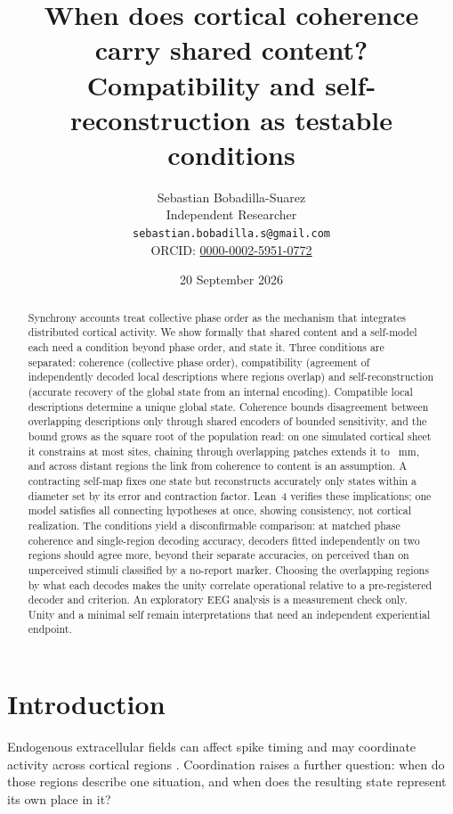 \documentclass[12pt]{article}
\title{When does cortical coherence carry shared content?\\
 Compatibility and self-reconstruction as testable conditions}
\author{Sebastian Bobadilla-Suarez\\
Independent Researcher\\
\texttt{sebastian.bobadilla.s@gmail.com}\\
ORCID: \href{https://orcid.org/0000-0002-5951-0772}{0000-0002-5951-0772}}
\date{20 September 2026}
\renewcommand{\cite}[1]{\citep{#1}}
\begin{document}
\begingroup
\singlespacing
\maketitle
\endgroup

\begin{abstract}
\singlespacing
\small
Synchrony accounts treat collective phase order as the mechanism that integrates distributed cortical activity. We show formally that shared content and a self-model each need a condition beyond phase order, and state it. Three conditions are separated: coherence (collective phase order), compatibility (agreement of independently decoded local descriptions where regions overlap) and self-reconstruction (accurate recovery of the global state from an internal encoding). Compatible local descriptions determine a unique global state. Coherence bounds disagreement between overlapping descriptions only through shared encoders of bounded sensitivity, and the bound grows as the square root of the population read: on one simulated cortical sheet it constrains at most \wavePatchInformativeSites{} sites, chaining through overlapping patches extends it to \waveNerveReachMm~mm, and across distant regions the link from coherence to content is an assumption. A contracting self-map fixes one state but reconstructs accurately only states within a diameter set by its error and contraction factor. Lean~4 verifies these implications; one model satisfies all connecting hypotheses at once, showing consistency, not cortical realization. The conditions yield a disconfirmable comparison: at matched phase coherence and single-region decoding accuracy, decoders fitted independently on two regions should agree more, beyond their separate accuracies, on perceived than on unperceived stimuli classified by a no-report marker. Choosing the overlapping regions by what each decodes makes the unity correlate operational relative to a pre-registered decoder and criterion. An exploratory EEG analysis is a measurement check only. Unity and a minimal self remain interpretations that need an independent experiential endpoint.
\end{abstract}
\linenumbers

\section{Introduction}
\label{sec:intro}

Endogenous extracellular fields can affect spike timing
\cite{frohlich2010,anastassiou2015} and may coordinate activity across cortical
regions \cite{mcfadden2002,mcfadden2020,pockett2012}.
Coordination raises a further question: when do those regions describe one
situation, and when does the resulting state represent its own place in it?
\end{document}
